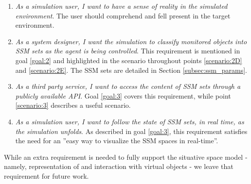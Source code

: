 \begin{enumerate}
	\item[\textlabel{5.}{us:5}] \emph{As a simulation user, I want to have a sense of reality in the simulated environment}. The user should comprehend and fell present in the target environment.

	\item[\textlabel{6.}{us:6}] \emph{As a system designer, I want the simulation to classify monitored objects into SSM sets as the agent is being controlled}. This requirement is mentioned in goal \ref{goal:2} and highlighted in the scenario throughout points \ref{scenario:2D} and \ref{scenario:2E}. The SSM sets are detailed in Section \ref{subsec:ssm_params}.

	\item[\textlabel{7.}{us:7}] \emph{As a third party service, I want to access the content of SSM sets through a publicly available API}. Goal \ref{goal:3} covers this requirement, while point \ref{scenario:3} describes a useful scenario.

	\item[\textlabel{8.}{us:8}] \emph{As a simulation user, I want to follow the state of SSM sets, in real time, as the simulation unfolds}. As described in goal \ref{goal:3}, this requirement satisfies the need for an ''easy way to visualize the SSM spaces in real-time''.

\end{enumerate}

While an extra requirement is needed to fully support the situative space model - namely, representation of and interaction with virtual objects - we leave that requirement for future work.\\

